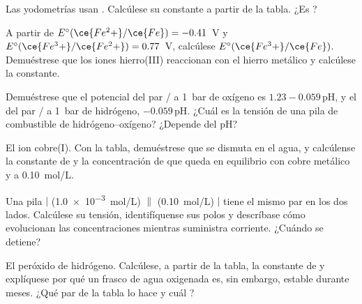 \begin{exercise}[$\star\star$]\label{exo:b1:nernst:7}
Las yodometrías usan . Calcúlese su
constante a partir de la tabla. ¿Es ?
\end{exercise}

\begin{exercise}[$\star\star$]\label{exo:b1:nernst:8}
A partir de $E^\circ(\ce{Fe^2+}/\ce{Fe}) = -0.41$~V y $E^\circ(\ce{Fe^3+}/\ce{Fe^2+})
= 0.77$~V, calcúlese $E^\circ(\ce{Fe^3+}/\ce{Fe})$. Demuéstrese que los
iones hierro(III) reaccionan con el hierro metálico y calcúlese la
constante.
\end{exercise}

\begin{exercise}[$\star\star$]\label{exo:b1:nernst:9}
Demuéstrese que el potencial del par / a \qty{1}{bar} de
oxígeno es $1.23 - 0.059\,\mathrm{pH}$, y el del par / a
\qty{1}{bar} de hidrógeno, $-0.059\,\mathrm{pH}$. ¿Cuál es la tensión de
una pila de combustible de hidrógeno--oxígeno? ¿Depende del pH?
\end{exercise}

\begin{exercise}[$\star\star\star$]\label{exo:b1:nernst:10}
El ion cobre(I). Con la tabla, demuéstrese que  se dismuta en el
agua, y calcúlense la constante de  y la
concentración de  que queda en equilibrio con cobre metálico y
 a \qty{0.10}{mol/L}.
\end{exercise}

\begin{exercise}[$\star\star\star$]\label{exo:b1:nernst:11}
Una pila  $|$  (\qty{1.0e-3}{mol/L}) $\|$ 
(\qty{0.10}{mol/L}) $|$  tiene el mismo par en los dos lados.
Calcúlese su tensión, identifíquense sus polos y descríbase cómo
evolucionan las concentraciones mientras suministra corriente. ¿Cuándo
se detiene?
\end{exercise}

\begin{exercise}[$\star\star\star$]\label{exo:b1:nernst:12}
El peróxido de hidrógeno. Calcúlese, a partir de la tabla, la constante
de  y explíquese por qué un frasco de agua
oxigenada es, sin embargo, estable durante meses. ¿Qué par de la tabla lo
hace  y cuál ?
\end{exercise}


